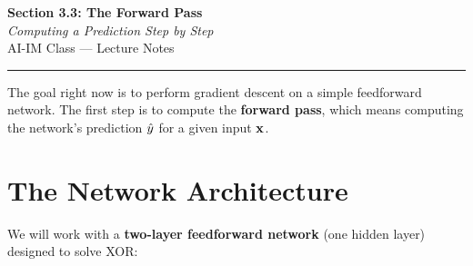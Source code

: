 \documentclass[12pt, a4paper]{article}
\begin{document}
\begin{center}
  {\LARGE \textbf{Section 3.3: The Forward Pass}} \\[0.3em]
  {\large\itshape Computing a Prediction Step by Step} \\[0.5em]
  {\large AI-IM Class --- Lecture Notes}%
  \ifstudentmode
  \fi
\end{center}

\vspace{1em}
\hrule
\vspace{1.5em}

The goal right now is to perform gradient descent on a simple feedforward network. The first step is to compute the \textbf{forward pass}, which means computing the network's prediction $\hat{y}$ for a given input $\mathbf{x}$.
\section{The Network Architecture}
We will work with a \textbf{two-layer feedforward network} (one hidden layer)
designed to solve XOR:
\end{document}
